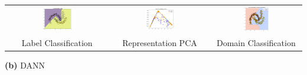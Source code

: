 \documentclass{article}
\begin{document}
\begin{minipage}{0.8\linewidth}
\centering
\begin{tabular}{ccc}
\includegraphics[width=0.3\textwidth]{DANN/label_decision_dann.png} &
\includegraphics[width=0.3\textwidth]{DANN/feature_dann.png} &
\includegraphics[width=0.3\textwidth]{DANN/domain_decision_dann.png} \\
\small Label Classification & \small Representation PCA & \small Domain Classification
\end{tabular}
\end{minipage}

\vspace{0.3cm}
\centering
\small\textbf{(b)} DANN
\end{document}
